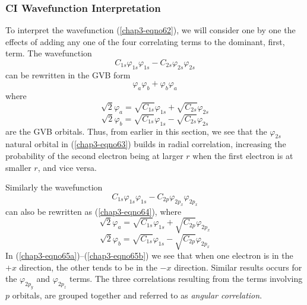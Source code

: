 \subsubsection{CI Wavefunction Interpretation}

To interpret the wavefunction (\ref{chap3-eqno62}), we will consider
one by one the effects of adding any one of the four correlating terms
to the dominant, first, term.  The wavefunction
\begin{equation}
C_{1s} \varphi_{1s} \varphi_{1s} - C_{2s} \varphi_{2s} \varphi_{2s}
\label{chap3-eqno63}
\end{equation}
can be rewritten in the GVB form
\begin{equation}
\varphi_a \varphi_b + \varphi_b \varphi_a
\label{chap3-eqno64}
\end{equation}
where
\begin{equation}
\sqrt{2} \varphi_a = \sqrt{C_{1s}} \varphi_{1s} + \sqrt{C_{2s}} \varphi_{2s}
\end{equation}
\begin{equation}
\sqrt{2} \varphi_b = \sqrt{C_{1s}} \varphi_{1s} - \sqrt{C_{2s}} \varphi_{2s}
\end{equation}
are the GVB orbitals.  Thus, from earlier in this section, we see that
the $\varphi_{2s}$ natural orbital in (\ref{chap3-eqno63}) builds in
radial correlation, increasing the probability of the second electron
being at larger $r$ when the first electron is at smaller $r$, and
vice versa.

Similarly the wavefunction
\begin{equation}
C_{1s} \varphi_{1s} \varphi_{1s} - C_{2p} \varphi_{2p_x} \varphi_{2p_x}
\end{equation}
can also be rewritten as (\ref{chap3-eqno64}), where
\begin{equation}
\sqrt{2} \varphi_a = \sqrt{C_{1s}} \varphi_{1s} + \sqrt{C_{2p}} 
\varphi_{2p_x}
\label{chap3-eqno65a}
\end{equation}
\begin{equation}
\sqrt{2} \varphi_b = \sqrt{C_{1s}} \varphi_{1s} - \sqrt{C_{2p}} 
\varphi_{2p_x}
\label{chap3-eqno65b}
\end{equation}
In (\ref{chap3-eqno65a})--(\ref{chap3-eqno65b}) we see that when one
electron is in the $+x$ direction, the other tends to be in the $-x$
direction.  Similar results occurs for the $\varphi_{2p_y}$ and
$\varphi_{2p_z}$ terms.  The three correlations resulting from the
terms involving $p$ orbitals, are grouped together and referred to as
\emph{angular correlation}.

